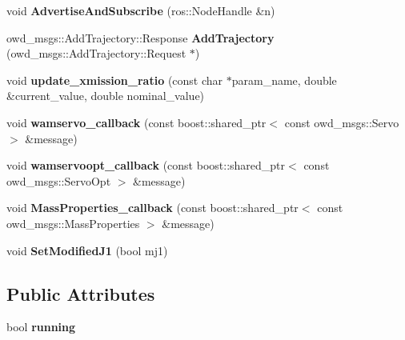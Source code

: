\begin{DoxyCompactItemize}
\item 
\hypertarget{classOWD_1_1WamDriver_a787133274cc62a57a338263b3ee90b39}{void {\bfseries Advertise\-And\-Subscribe} (ros\-::\-Node\-Handle \&n)}\label{classOWD_1_1WamDriver_a787133274cc62a57a338263b3ee90b39}

\item 
\hypertarget{classOWD_1_1WamDriver_a632a676878dd657f81e69bf004d34c9c}{owd\-\_\-msgs\-::\-Add\-Trajectory\-::\-Response {\bfseries Add\-Trajectory} (owd\-\_\-msgs\-::\-Add\-Trajectory\-::\-Request $\ast$)}\label{classOWD_1_1WamDriver_a632a676878dd657f81e69bf004d34c9c}

\item 
\hypertarget{classOWD_1_1WamDriver_a6af3daa62aade906f99c17832b600b22}{void {\bfseries update\-\_\-xmission\-\_\-ratio} (const char $\ast$param\-\_\-name, double \&current\-\_\-value, double nominal\-\_\-value)}\label{classOWD_1_1WamDriver_a6af3daa62aade906f99c17832b600b22}

\item 
\hypertarget{classOWD_1_1WamDriver_a04d519830168e5b5155471523913968c}{void {\bfseries wamservo\-\_\-callback} (const boost\-::shared\-\_\-ptr$<$ const owd\-\_\-msgs\-::\-Servo $>$ \&message)}\label{classOWD_1_1WamDriver_a04d519830168e5b5155471523913968c}

\item 
\hypertarget{classOWD_1_1WamDriver_a981901f1f18e0c4ad453b631c9bea501}{void {\bfseries wamservoopt\-\_\-callback} (const boost\-::shared\-\_\-ptr$<$ const owd\-\_\-msgs\-::\-Servo\-Opt $>$ \&message)}\label{classOWD_1_1WamDriver_a981901f1f18e0c4ad453b631c9bea501}

\item 
\hypertarget{classOWD_1_1WamDriver_a51a6533134112326c9f07f91ee1f7f8c}{void {\bfseries Mass\-Properties\-\_\-callback} (const boost\-::shared\-\_\-ptr$<$ const owd\-\_\-msgs\-::\-Mass\-Properties $>$ \&message)}\label{classOWD_1_1WamDriver_a51a6533134112326c9f07f91ee1f7f8c}

\item 
\hypertarget{classOWD_1_1WamDriver_adcf528d1f38ea6a3631b2ef6a0c9323d}{void {\bfseries Set\-Modified\-J1} (bool mj1)}\label{classOWD_1_1WamDriver_adcf528d1f38ea6a3631b2ef6a0c9323d}

\end{DoxyCompactItemize}
\subsection*{Public Attributes}
\begin{DoxyCompactItemize}
\item 
\hypertarget{classOWD_1_1WamDriver_a6e5fddf2831933962a255887ab786803}{bool {\bfseries running}}\label{classOWD_1_1WamDriver_a6e5fddf2831933962a255887ab786803}

\end{DoxyCompactItemize}
